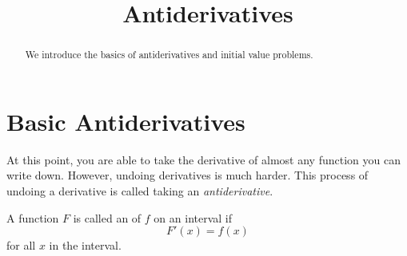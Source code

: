 \documentclass{ximera}
\title{Antiderivatives}
\begin{document}
\begin{abstract}
  We introduce the basics of antiderivatives and initial value problems.
\end{abstract}
\maketitle

\section{Basic Antiderivatives}
%







At this point, you are able to take the derivative of almost any function you can write
down. However, undoing derivatives is much harder. This process of
undoing a derivative is called taking an \textit{antiderivative}.

\begin{definition}
A function $F$ is called an  of $f$ on an
interval if
\[
F'(x) = f(x)
\]
for all $x$ in the interval.
\end{definition}

\end{document}
